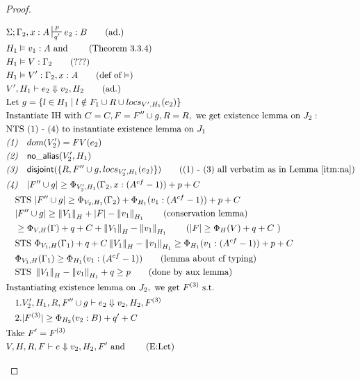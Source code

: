 \documentclass[11pt]{article}
\newcommand{\na}[1]{\mathsf{no\_alias}(#1)}
\newcommand{\dist}[1]{\mathsf{disjoint}(#1)}
\newcommand{\ssize}[2]{\left\Vert #2 \right\Vert_{#1}}
\newcommand{\cf}[1]{#1^{cf}}
\theoremstyle{definition}
\begin{document}
\begin{proof}
\begin{description}
\begin{align*}
  &\Sigma; \Gamma_2, x : A \sststile{q'}{p} e_2 : B \tag{ad.}\\
  &H_1 \vDash v_1 : A \text{ and } \tag{Theorem 3.3.4}\\ 
  &H_1 \vDash V : \Gamma_2 \tag{???}\\
  &H_1 \vDash V' : \Gamma_2, x : A \tag{def of $\vDash$}\\
  &V',H_1 \vdash e_2 \Downarrow v_2,H_2 \tag{ad.}\\
  &\text{Let } g = \{l \in H_1 \mid l \notin F_1 \cup R \cup locs_{V',H_1}(e_2)\}\\ 
  &\text{Instantiate IH with } C = C, F = F'' \cup g, R = R, \text{ we get existence lemma on  } J_2:\\
  &\text{NTS (1) - (4) to instantiate existence lemma on } J_1\\
  &\emph{(1)} \quad dom(V_2') = FV(e_2)\\
  &\emph{(2)} \quad \na{V_2',H_1} \\
  &\emph{(3)} \quad \dist{\{R,F'' \cup g,locs_{V_2',H_1}(e_2)\}} \tag{(1) - (3) all verbatim as in Lemma $\ref{itm:na}$}\\
  &\emph{(4)} \quad |F'' \cup g| \ge \Phi_{V_2',H_1}(\Gamma_2,x: (\cf{A} - 1)) + p + C\\
  &\quad \text{STS } |F'' \cup g| \ge \Phi_{V_2,H_1}(\Gamma_2) + \Phi_{H_1}(v_1 : (\cf{A} - 1)) + p + C\\
  &\quad |F'' \cup g| \ge \ssize{H}{V_1} + |F| - \ssize{H_1}{v_1} \tag{conservation lemma}\\
  &\quad \ge \Phi_{V,H}(\Gamma) + q + C + \ssize{H}{V_1} - \ssize{H_1}{v_1} 
    \tag{$|F| \ge \Phi_{H}(V) + q + C$ }\\
  &\quad \text{STS } \Phi_{V_1,H}(\Gamma_1) + q + C \ssize{H}{V_1} - \ssize{H_1}{v_1} \ge \Phi_{H_1}(v_1 : (\cf{A} - 1)) + p + C\\
  &\quad \Phi_{V_1,H}(\Gamma_1) \ge \Phi_{H_1}(v_1 : (\cf{A} - 1)) \tag{lemma about cf typing}\\
  &\quad \text{STS } \ssize{H}{V_1} - \ssize{H_1}{v_1} + q \ge p \tag{done by aux lemma}\\
  &\text{Instantiating existence lemma on } J_2, \text{ we get } F^{(3)} \text{ s.t. }\\
  &\quad 1. V_2',H_1,R, F'' \cup g \vdash e_2 \Downarrow v_2,H_2,F^{(3)} \\
  &\quad 2. |F^{(3)}| \ge \Phi_{H_2}(v_2:B) + q' + C\\
  &\text{Take } F' = F^{(3)}\\
  &V,H,R,F \vdash e \Downarrow v_2, H_2,F' \text{ and } \tag{E:Let}\\ 

\end{align*}
\end{description}
\end{proof}
\end{document}

